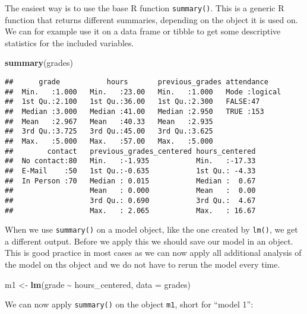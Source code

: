 \documentclass[
]{book}
\newenvironment{Shaded}{\begin{snugshade}}{\end{snugshade}}
\newcommand{\AttributeTok}[1]{\textcolor[rgb]{0.13,0.29,0.53}{#1}}
\newcommand{\FunctionTok}[1]{\textcolor[rgb]{0.13,0.29,0.53}{\textbf{#1}}}
\newcommand{\NormalTok}[1]{#1}
\newcommand{\OtherTok}[1]{\textcolor[rgb]{0.56,0.35,0.01}{#1}}
\newcommand{\SpecialCharTok}[1]{\textcolor[rgb]{0.81,0.36,0.00}{\textbf{#1}}}
\begin{document}
The easiest way is to use the base R function \texttt{summary()}. This is a generic R
function that returns different summaries, depending on the object it is used
on. We can for example use it on a data frame or tibble to get some descriptive
statistics for the included variables.

\begin{Shaded}
\begin{Highlighting}[]
\FunctionTok{summary}\NormalTok{(grades)}
\end{Highlighting}
\end{Shaded}

\begin{verbatim}
##      grade           hours       previous_grades attendance     
##  Min.   :1.000   Min.   :23.00   Min.   :1.000   Mode :logical  
##  1st Qu.:2.100   1st Qu.:36.00   1st Qu.:2.300   FALSE:47       
##  Median :3.000   Median :41.00   Median :2.950   TRUE :153      
##  Mean   :2.967   Mean   :40.33   Mean   :2.935                  
##  3rd Qu.:3.725   3rd Qu.:45.00   3rd Qu.:3.625                  
##  Max.   :5.000   Max.   :57.00   Max.   :5.000                  
##        contact   previous_grades_centered hours_centered  
##  No contact:80   Min.   :-1.935           Min.   :-17.33  
##  E-Mail    :50   1st Qu.:-0.635           1st Qu.: -4.33  
##  In Person :70   Median : 0.015           Median :  0.67  
##                  Mean   : 0.000           Mean   :  0.00  
##                  3rd Qu.: 0.690           3rd Qu.:  4.67  
##                  Max.   : 2.065           Max.   : 16.67
\end{verbatim}

When we use \texttt{summary()} on a model object, like the one created by \texttt{lm()}, we
get a different output. Before we apply this we should save our model in an
object. This is good practice in most cases as we can now apply all additional
analysis of the model on ths object and we do not have to rerun the model
every time.

\begin{Shaded}
\begin{Highlighting}[]
\NormalTok{m1 }\OtherTok{\textless{}{-}} \FunctionTok{lm}\NormalTok{(grade }\SpecialCharTok{\textasciitilde{}}\NormalTok{ hours\_centered, }\AttributeTok{data =}\NormalTok{ grades)}
\end{Highlighting}
\end{Shaded}

We can now apply \texttt{summary()} on the object \texttt{m1}, short for ``model 1'':
\end{document}
